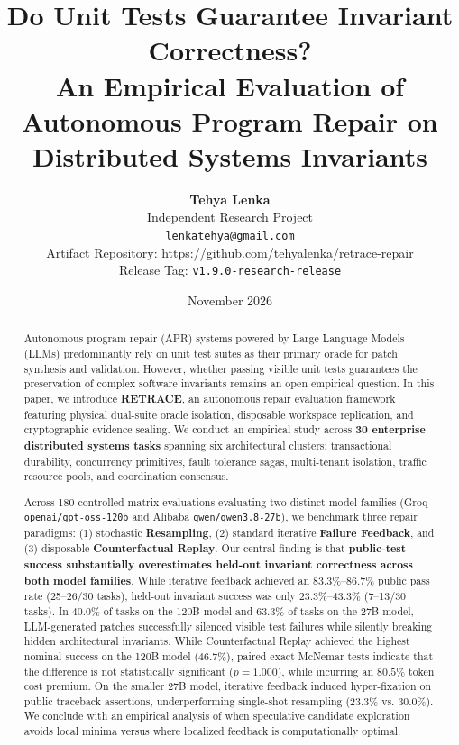 \documentclass[10pt,twocolumn,letterpaper]{article}
\title{\textbf{Do Unit Tests Guarantee Invariant Correctness?\\An Empirical Evaluation of Autonomous Program Repair on Distributed Systems Invariants}}
\author{
    \textbf{Tehya Lenka} \\
    Independent Research Project \\
    \texttt{lenkatehya@gmail.com} \\
    \small Artifact Repository: \url{https://github.com/tehyalenka/retrace-repair} \\
    \small Release Tag: \texttt{v1.9.0-research-release}
}
\date{November 2026}
\begin{document}
\maketitle

\begin{abstract}
Autonomous program repair (APR) systems powered by Large Language Models (LLMs) predominantly rely on unit test suites as their primary oracle for patch synthesis and validation. However, whether passing visible unit tests guarantees the preservation of complex software invariants remains an open empirical question. In this paper, we introduce \textbf{RETRACE}, an autonomous repair evaluation framework featuring physical dual-suite oracle isolation, disposable workspace replication, and cryptographic evidence sealing. We conduct an empirical study across \textbf{30 enterprise distributed systems tasks} spanning six architectural clusters: transactional durability, concurrency primitives, fault tolerance sagas, multi-tenant isolation, traffic resource pools, and coordination consensus. 

Across 180 controlled matrix evaluations evaluating two distinct model families (Groq \texttt{openai/gpt-oss-120b} and Alibaba \texttt{qwen/qwen3.8-27b}), we benchmark three repair paradigms: (1) stochastic \textbf{Resampling}, (2) standard iterative \textbf{Failure Feedback}, and (3) disposable \textbf{Counterfactual Replay}. Our central finding is that \textbf{public-test success substantially overestimates held-out invariant correctness across both model families}. While iterative feedback achieved an $83.3\%$--$86.7\%$ public pass rate (25--26/30 tasks), held-out invariant success was only $23.3\%$--$43.3\%$ (7--13/30 tasks). In $40.0\%$ of tasks on the 120B model and $63.3\%$ of tasks on the 27B model, LLM-generated patches successfully silenced visible test failures while silently breaking hidden architectural invariants. While Counterfactual Replay achieved the highest nominal success on the 120B model ($46.7\%$), paired exact McNemar tests indicate that the difference is not statistically significant ($p = 1.000$), while incurring an $80.5\%$ token cost premium. On the smaller 27B model, iterative feedback induced hyper-fixation on public traceback assertions, underperforming single-shot resampling ($23.3\%$ vs. $30.0\%$). We conclude with an empirical analysis of when speculative candidate exploration avoids local minima versus where localized feedback is computationally optimal.
\end{abstract}
\end{document}
